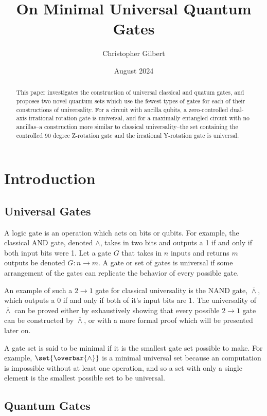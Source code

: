 \documentclass[12pt]{article}
\title{On Minimal Universal Quantum Gates}
\author{Christopher Gilbert}
\date{August 2024}
\begin{document}
\maketitle

\begin{abstract}
This paper investigates the construction of universal classical and quatum gates, and proposes two novel quantum sets which use the fewest types of gates for each of their constructions of universality. For a circuit with ancilla qubits, a zero-controlled dual-axis irrational rotation gate is universal, and for a maximally entangled circuit with no ancillas--a construction more similar to classical universality--the set containing the controlled 90 degree Z-rotation gate and the irrational Y-rotation gate is universal.
\end{abstract}

\section{Introduction}

\subsection{Universal Gates}
A logic gate is an operation which acts on bits or qubits. For example, the classical AND gate, denoted $\land$, takes in two bits and outputs a 1 if and only if both input bits were 1. Let a gate $G$ that takes in $n$ inputs and returns $m$ outputs be denoted $G : n \to m$. A gate or set of gates is universal if some arrangement of the gates can replicate the behavior of every possible gate.

An example of such a $2 \to 1$ gate for classical universality is the NAND gate, $\overline{\land}$, which outputs a 0 if and only if both of it's input bits are 1. The universality of $\overline{\land}$ can be proved either by exhaustively showing that every possible $2 \to 1$ gate can be constructed by $\overline{\land}$, or with a more formal proof which will be presented later on.

A gate set is said to be minimal if it is the smallest gate set possible to make. For example, $\set{\overbar{\land}}$ is a minimal universal set because an computation is impossible without at least one operation, and so a set with only a single element is the smallest possible set to be universal.

\subsection{Quantum Gates}
\end{document}
